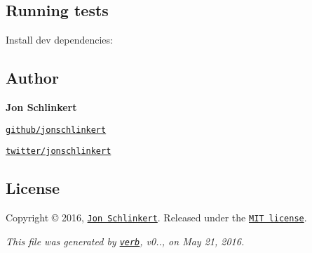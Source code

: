 \subsection*{Running tests}

Install dev dependencies\+:




\subsection*{Author}

{\bfseries Jon Schlinkert}


\begin{DoxyItemize}
\item \href{https://github.com/jonschlinkert}{\tt github/jonschlinkert}
\item \href{http://twitter.com/jonschlinkert}{\tt twitter/jonschlinkert}
\end{DoxyItemize}

\subsection*{License}

Copyright © 2016, \href{https://github.com/jonschlinkert}{\tt Jon Schlinkert}. Released under the \href{https://github.com/jonschlinkert/braces/blob/master/LICENSE}{\tt M\+IT license}.





{\itshape This file was generated by \href{https://github.com/verbose/verb}{\tt verb}, v0.., on May 21, 2016.} 